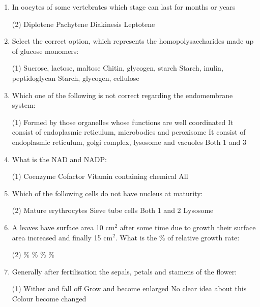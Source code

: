 \documentclass[twocolumn]{article}
\begin{document}
\begin{enumerate}
    \item In oocytes of some vertebrates which stage can last for months or years
    \begin{tasks}(2)
        \task Diplotene
        \task Pachytene
        \task Diakinesis
        \task Leptotene
    \end{tasks}

    \item Select the correct option, which represents the homopolysaccharides made up of glucose monomers:
    \begin{tasks}(1)
        \task Sucrose, lactose, maltose
        \task Chitin, glycogen, starch
        \task Starch, inulin, peptidoglycan
        \task Starch, glycogen, cellulose
    \end{tasks}

    \item Which one of the following is not correct regarding the endomembrane system:
    \begin{tasks}(1)
        \task Formed by those organelles whose functions are well coordinated
        \task It consist of endoplasmic reticulum, microbodies and peroxisome
        \task It consist of endoplasmic reticulum, golgi complex, lysosome and vacuoles
        \task Both 1 and 3
    \end{tasks}

    \item What is the NAD and NADP:
    \begin{tasks}(1)
        \task Coenzyme
        \task Cofactor
        \task Vitamin containing chemical
        \task All
    \end{tasks}

    \item Which of the following cells do not have nucleus at maturity:
    \begin{tasks}(2)
        \task Mature erythrocytes
        \task Sieve tube cells
        \task Both 1 and 2
        \task Lysosome
    \end{tasks}

    \item A leaves have surface area 10 cm\(^2\) after some time due to growth their surface area increased and finally 15 cm\(^2\). What is the \% of relative growth rate:
    \begin{tasks}(2)
         \%
         \%
         \%
         \%
    \end{tasks}

    \item Generally after fertilisation the sepals, petals and stamens of the flower:
    \begin{tasks}(1)
        \task Wither and fall off
        \task Grow and become enlarged
        \task No clear idea about this
        \task Colour become changed
    \end{tasks}


\end{enumerate}
\end{document}
